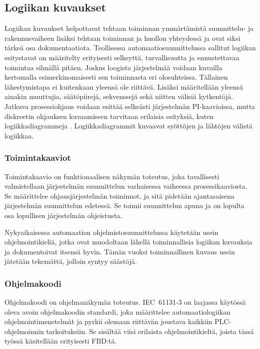 \documentclass[finnish,12pt]{article}
\begin{document}
	\subsection{Logiikan kuvaukset}

Logiikan kuvaukset helpottavat tehtaan toiminnan ymmärtämistä suunnittelu- ja rakennusvaiheen lisäksi tehtaan toiminnan ja huollon yhteydessä ja ovat siksi tärkeä osa dokumentaatiota.
Teollisessa automaatiosuunnittelussa sallitut logiikan esitystavat on määritelty erityisesti selkeyttä, turvallisuutta ja ennustettavaa toimintaa silmällä pitäen.
Joskus loogista järjestelmää voidaan kuvailla kertomalla esimerkinomaisesti sen toiminnasta eri olosuhteissa.
Tällainen lähestymistapa ei kuitenkaan yleensä ole riittävä.
Lisäksi määritellään yleensä ainakin muuttujia, säätöpiirejä, sek\-venssejä sekä niitten välisiä kytkentöjä.\cite{RefWorks:41}
Jatkuva prosessiohjaus voidaan esittää selkeästi järjestelmän PI-kaavioissa, mutta diskreetin ohjauksen kuvaamiseen tarvitaan erilaisia esityksiä, kuten logiikkadiagrammeja \cite{RefWorks:54}. 
Logiikkadiagrammit kuvaavat syöttöjen ja lähtöjen välistä logiikkaa.

		\subsubsection{Toimintakaaviot}

Toimintakaavio on funktionaalisen näkymän toteutus, joka tavallisesti valmistellaan järjestelmän suunnittelun varhaisessa vaiheessa prosessikaaviosta.
Se määrittelee ohjausjärjestelmän toiminnot, ja sitä pidetään ajantasaisena järjestelmän suunnittelun edetessä.
Se toimii suunnittelun apuna ja on lopulta osa lopullisen järjestelmän ohjeistusta.

Nykyaikaisessa automaation ohjelmistosuunnittelussa käytetään usein ohjelmointikieliä, jotka ovat muodoltaan lähellä toiminnallisia logiikan kuvauksia ja dokumentoivat itsensä hyvin.
Tämän vuoksi toiminnallinen kuvaus usein jätetään tekemättä, jolloin syntyy säästöjä. \cite{RefWorks:41}

		\subsubsection{Ohjelmakoodi}

Ohjelmakoodi on ohjelmanäkymän toteutus.
IEC~61131-3 on laajassa käytössä oleva avoin ohjelmakoodin standardi, joka määrittelee automaatiologiikan ohjelmointimenetelmät ja pyrkii olemaan riittävän joustava kaikkiin PLC-ohjelmoinnin tarkoituksiin.
Se sisältää viisi erilaista ohjelmointikieltä, joista tässä työssä käsitellään erityisesti FBD:tä. \cite{RefWorks:62}
\end{document}
